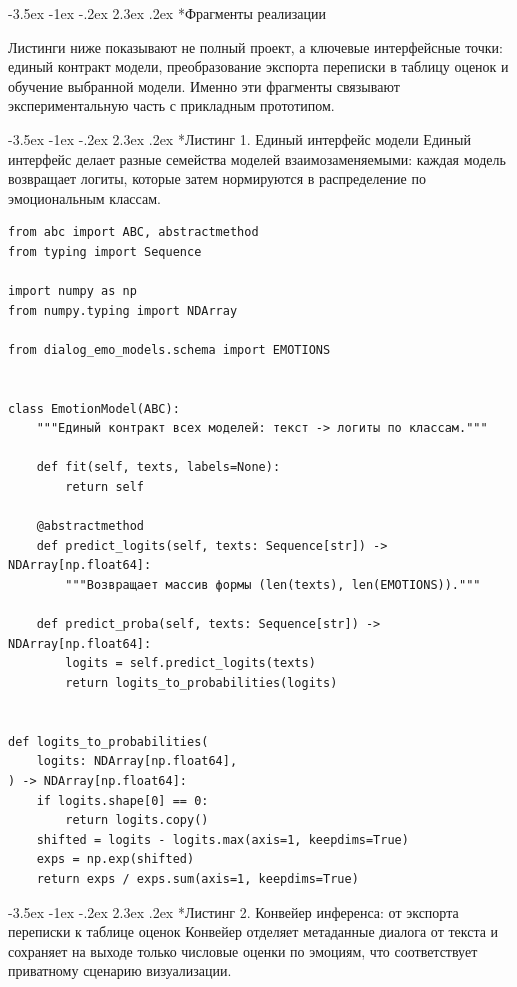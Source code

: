 \documentclass[12pt,a4paper]{report}
\makeatletter
\renewcommand{\section}{\@startsection{section}{1}{\z@}%
  {-3.5ex \@plus -1ex \@minus -.2ex}%
  {2.3ex \@plus .2ex}%
  {\normalfont\large\bfseries\centering}}
\makeatother
\begin{document}
\section*{Фрагменты реализации}

Листинги ниже показывают не полный проект, а ключевые интерфейсные точки: единый контракт модели, преобразование экспорта переписки в таблицу оценок и обучение выбранной модели. Именно эти фрагменты связывают экспериментальную часть с прикладным прототипом.

\begingroup
\small

\section*{Листинг 1. Единый интерфейс модели}
Единый интерфейс делает разные семейства моделей взаимозаменяемыми: каждая модель возвращает логиты, которые затем нормируются в распределение по эмоциональным классам.

\begin{verbatim}
from abc import ABC, abstractmethod
from typing import Sequence

import numpy as np
from numpy.typing import NDArray

from dialog_emo_models.schema import EMOTIONS


class EmotionModel(ABC):
    """Единый контракт всех моделей: текст -> логиты по классам."""

    def fit(self, texts, labels=None):
        return self

    @abstractmethod
    def predict_logits(self, texts: Sequence[str]) -> NDArray[np.float64]:
        """Возвращает массив формы (len(texts), len(EMOTIONS))."""

    def predict_proba(self, texts: Sequence[str]) -> NDArray[np.float64]:
        logits = self.predict_logits(texts)
        return logits_to_probabilities(logits)


def logits_to_probabilities(
    logits: NDArray[np.float64],
) -> NDArray[np.float64]:
    if logits.shape[0] == 0:
        return logits.copy()
    shifted = logits - logits.max(axis=1, keepdims=True)
    exps = np.exp(shifted)
    return exps / exps.sum(axis=1, keepdims=True)
\end{verbatim}

\section*{Листинг 2. Конвейер инференса: от экспорта переписки к таблице оценок}
Конвейер отделяет метаданные диалога от текста и сохраняет на выходе только числовые оценки по эмоциям, что соответствует приватному сценарию визуализации.
\end{document}
